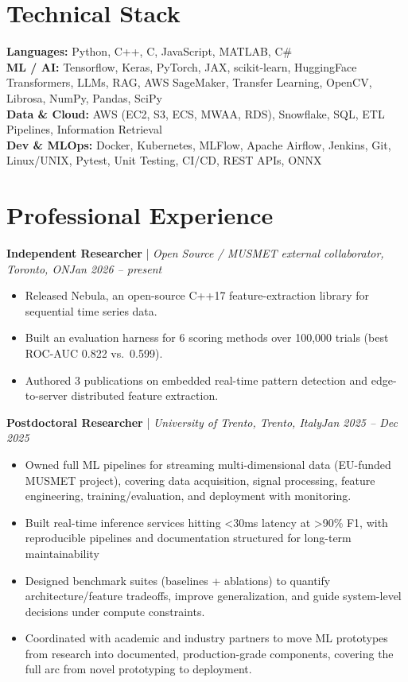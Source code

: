 \documentclass[11pt]{article}
\newenvironment{cvrole}[5]{%
  \par\noindent\textbf{\large #1} | \textit{\small #2, #3}\hfill \textit{\small #4 -- #5}\par
  \begin{itemize}[leftmargin=2em, itemsep=-0.3em, topsep=-0.5em]%
}{%
  \end{itemize}\par\noindent\mbox{}\par\vspace{0.1em}%
}
\begin{document}
\section*{Technical Stack}
\textbf{Languages:} Python, C++, C, JavaScript, MATLAB, C\#\\
\textbf{ML / AI:} Tensorflow, Keras, PyTorch, JAX, scikit-learn, HuggingFace Transformers, LLMs, RAG, AWS SageMaker, Transfer Learning, OpenCV, Librosa, NumPy, Pandas, SciPy\\
\textbf{Data \& Cloud:} AWS (EC2, S3, ECS, MWAA, RDS), Snowflake, SQL, ETL Pipelines, Information Retrieval\\
\textbf{Dev \& MLOps:} Docker, Kubernetes, MLFlow, Apache Airflow, Jenkins, Git, Linux/UNIX, Pytest, Unit Testing, CI/CD, REST APIs, ONNX

\section*{Professional Experience}
\begin{cvrole}{Independent Researcher}{Open Source / MUSMET external collaborator}{Toronto, ON}{Jan 2026}{present}
    \item Released Nebula, an open-source C++17 feature-extraction library for sequential time series data.
    \item Built an evaluation harness for 6 scoring methods over 100,000 trials (best ROC-AUC 0.822 vs.\ 0.599).
    \item Authored 3 publications on embedded real-time pattern detection and edge-to-server distributed feature extraction.
\end{cvrole}

\begin{cvrole}{Postdoctoral Researcher}{University of Trento}{Trento, Italy}{Jan 2025}{Dec 2025}
    \item Owned full ML pipelines for streaming multi-dimensional data (EU-funded MUSMET project), covering data acquisition, signal processing, feature engineering, training/evaluation, and deployment with monitoring.
    \item Built real-time inference services hitting <30ms latency at >90\% F1, with reproducible pipelines and documentation structured for long-term maintainability
    \item Designed benchmark suites (baselines + ablations) to quantify architecture/feature tradeoffs, improve generalization, and guide system-level decisions under compute constraints.
    \item Coordinated with academic and industry partners to move ML prototypes from research into documented, production-grade components, covering the full arc from novel prototyping to deployment.
\end{cvrole}
\end{document}
